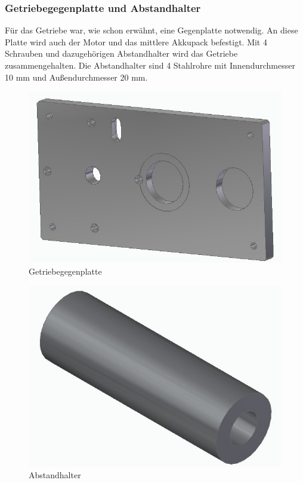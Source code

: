 \subsubsection*{Getriebegegenplatte und Abstandhalter}

Für das Getriebe war, wie schon erwähnt, eine Gegenplatte notwendig. An diese Platte wird auch der Motor und das mittlere Akkupack befestigt. Mit 4 Schrauben und dazugehörigen Abstandhalter wird das Getriebe zusammengehalten. Die Abstandhalter sind 4 Stahlrohre mit Innendurchmesser 10 mm und Außendurchmesser 20 mm.

\begin{figure} [H]
	\begin{center}
		\includegraphics[scale=0.5]{figures/mechanik/Aufbau_Seitenplatte_Links.jpg}
			\caption{Getriebegegenplatte}
			\label{Getriebegegenplatte}
	\end{center}
\end{figure}

\begin{figure} [H]
	\begin{center}
		\includegraphics[scale=0.3]{figures/mechanik/Seitenplatte_Abstandhalter.jpg}
			\caption{Abstandhalter}
			\label{Abstandhalter}
	\end{center}
\end{figure}

